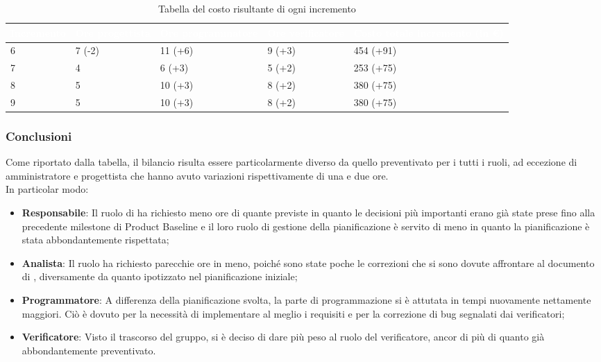 {
\renewcommand{\arraystretch}{1.65}
\centering
\begin{longtable}{ C{2.1cm} C{2.7cm} C{3cm} C{3cm} C{3.3cm} }
\caption{Tabella del costo risultante di ogni incremento}\\
\textcolor{white}{\textbf{Incremento}} & 
\textcolor{white}{\textbf{Ore progettista}} &
\textcolor{white}{\textbf{Ore programmatore}}&
\textcolor{white}{\textbf{Ore verificatore}}&
\textcolor{white}{\textbf{Costo totale incremento (in \euro{})}}\\
\endhead

6 & 7 (-2) & 11 (+6) & 9 (+3) & 454 (+91) \\
7 & 4      &  6 (+3) & 5 (+2) & 253 (+75) \\
8 & 5      & 10 (+3) & 8 (+2) & 380 (+75) \\
9 & 5      & 10 (+3) & 8 (+2) & 380 (+75) \\

\end{longtable}
}

\subsubsection{Conclusioni}
Come riportato dalla tabella, il bilancio risulta essere particolarmente diverso da quello preventivato per i tutti i ruoli, ad eccezione di amministratore e progettista che hanno avuto variazioni rispettivamente di una e due ore. \\
In particolar modo:
\begin{itemize}
	\item \textbf{Responsabile}: Il ruolo di \Responsabile{} ha richiesto meno ore di quante previste in quanto le decisioni più importanti erano già state prese fino alla precedente milestone di Product Baseline e il loro ruolo di gestione della pianificazione è servito di meno in quanto la pianificazione è stata abbondantemente rispettata;
	\item \textbf{Analista}: Il ruolo ha richiesto parecchie ore in meno, poiché sono state poche le correzioni che si sono dovute affrontare al documento di \AdR{}, diversamente da quanto ipotizzato nel pianificazione iniziale;
	\item \textbf{Programmatore}: A differenza della pianificazione svolta, la parte di programmazione si è attutata in tempi nuovamente nettamente maggiori. Ciò è dovuto per la necessità di implementare al meglio i requisiti e per la correzione di bug segnalati dai verificatori;
	\item \textbf{Verificatore}: Visto il trascorso del gruppo, si è deciso di dare più peso al ruolo del verificatore, ancor di più di quanto già abbondantemente preventivato.
\end{itemize}
